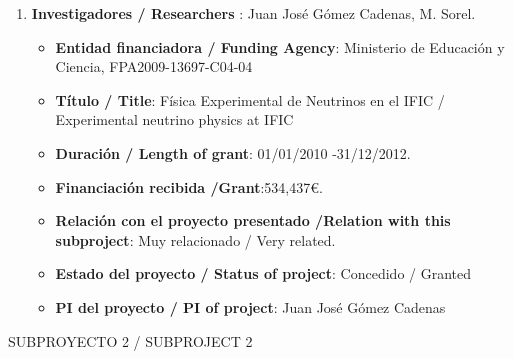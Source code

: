 \begin{enumerate}
\begin{itemize}
\item {\bf Título / Title}:  Coordination of NEXT Project.
\item {\bf Duración / Length of grant}: 01/01/2013 -31/12/2014. 
\item {\bf Financiación recibida /Grant}:256,000\euro. 
\item {\bf Relación con el proyecto presentado /Relation with this subproject}: Mismo tema /Same topic. 
\item {\bf Estado del proyecto / Status of project}: Concedido / Granted
\item {\bf PI del proyecto / PI of project}: Juan José Gómez Cadenas 
\end{itemize}
\item {\bf Investigadores / Researchers }: Juan José Gómez Cadenas, M. Sorel.
\begin{itemize}
\item {\bf Entidad financiadora / Funding Agency}:  Ministerio de Educaci\'on y Ciencia, FPA2009-13697-C04-04
\item {\bf Título / Title}:  Física Experimental de Neutrinos en el IFIC / Experimental neutrino physics at IFIC
\item {\bf Duración / Length of grant}: 01/01/2010 -31/12/2012. 
\item {\bf Financiación recibida /Grant}:534,437\euro. 
\item {\bf Relación con el proyecto presentado /Relation with this subproject}: Muy relacionado / Very related. 
\item {\bf Estado del proyecto / Status of project}: Concedido / Granted
\item {\bf PI del proyecto / PI of project}: Juan José Gómez Cadenas 
\end{itemize}
\end{enumerate}

{\sc SUBPROYECTO 2 / SUBPROJECT 2}

